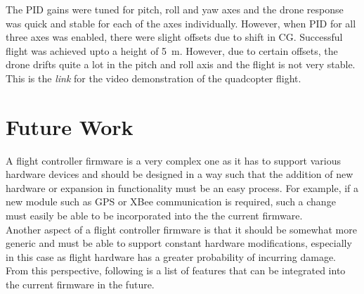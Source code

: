 \documentclass[a4paper,12pt,oneside]{book}
\begin{document}
\bigskip

The PID gains were tuned for pitch, roll and yaw axes and the drone response was quick and stable for each of the axes individually. However, when PID for all three axes was enabled, there were slight offsets due to shift in CG. Successful flight was achieved upto a height of \SI{5}{\m}. However, due to certain offsets, the drone drifts quite a lot in the pitch and roll axis and the flight is not very stable. This is the \textit{link} for the video demonstration of the quadcopter flight.\\

\chapter[Future Work]{Future Work}
A flight controller firmware is a very complex one as it has to support various hardware devices and should be designed in a way such that the addition of new hardware or expansion in functionality must be an easy process. For example, if a new module such as GPS or XBee communication is required, such a change must easily be able to be incorporated into the the current firmware.\\

Another aspect of a flight controller firmware is that it should be somewhat more generic and must be able to support constant hardware modifications, especially in this case as flight hardware has a greater probability of incurring damage. From this perspective, following is a list of features that can be integrated into the current firmware in the future.\\
\end{document}
